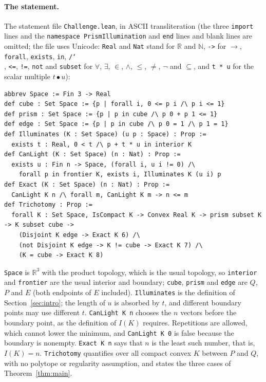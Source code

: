 \documentclass[11pt]{article}
\theoremstyle{definition}
\theoremstyle{remark}
\newcommand{\R}{\mathbb R}
\begin{document}
{\paragraph{The statement.} The statement file \texttt{Challenge.lean}, in
ASCII transliteration (the three \texttt{import} lines and the
\texttt{namespace PrismIllumination} and \texttt{end} lines and blank lines
are omitted; the
file uses Unicode: \texttt{Real} and \texttt{Nat} stand for $\R$ and
$\mathbb N$, \texttt{->} for $\to$, \texttt{forall}, \texttt{exists},
\texttt{in}, \texttt{/\char`\\}, \texttt{<=}, \texttt{!=}, \texttt{not} and
\texttt{subset} for $\forall$, $\exists$, $\in$, $\wedge$, $\le$, $\ne$,
$\neg$ and $\subseteq$, and \texttt{t * u} for the scalar multiple
$t\bullet u$):
{\footnotesize
\begin{verbatim}
abbrev Space := Fin 3 -> Real
def cube : Set Space := {p | forall i, 0 <= p i /\ p i <= 1}
def prism : Set Space := {p | p in cube /\ p 0 + p 1 <= 1}
def edge : Set Space := {p | p in cube /\ p 0 = 1 /\ p 1 = 1}
def Illuminates (K : Set Space) (u p : Space) : Prop :=
  exists t : Real, 0 < t /\ p + t * u in interior K
def CanLight (K : Set Space) (n : Nat) : Prop :=
  exists u : Fin n -> Space, (forall i, u i != 0) /\
    forall p in frontier K, exists i, Illuminates K (u i) p
def Exact (K : Set Space) (n : Nat) : Prop :=
  CanLight K n /\ forall m, CanLight K m -> n <= m
def Trichotomy : Prop :=
  forall K : Set Space, IsCompact K -> Convex Real K -> prism subset K -> K subset cube ->
    (Disjoint K edge -> Exact K 6) /\
    (not Disjoint K edge -> K != cube -> Exact K 7) /\
    (K = cube -> Exact K 8)
\end{verbatim}}
\noindent \texttt{Space} is $\R^3$ with the product topology, which is the
usual topology, so \texttt{interior} and \texttt{frontier} are the usual
interior and boundary; \texttt{cube}, \texttt{prism} and \texttt{edge} are
$Q$, $P$ and $E$ (both endpoints of $E$ included). \texttt{Illuminates} is the
definition of Section~\ref{sec:intro}; the length of $u$ is absorbed by $t$,
and different boundary points may use different $t$. \texttt{CanLight K n} chooses the $n$ vectors before the
boundary point, as the definition of $I(K)$ requires. Repetitions are allowed,
which cannot lower the minimum, and \texttt{CanLight K 0} is false because the
boundary is nonempty. \texttt{Exact K n} says that $n$ is the least such
number, that is, $I(K)=n$. \texttt{Trichotomy} quantifies over all compact
convex $K$ between $P$ and $Q$, with no polytope or regularity assumption, and
states the three cases of Theorem~\ref{thm:main}.

}
\end{document}
